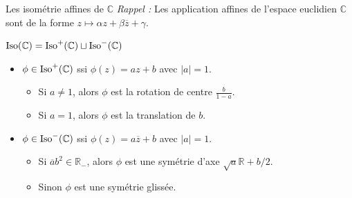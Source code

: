 \documentclass[bigger]{m53beamer}
\begin{document}
\begin{frame}{Les isométrie affines de $\mathbb{C}$}
  \textit{Rappel :} Les application affines de l'espace euclidien $\mathbb{C}$ sont de la forme $z \mapsto \alpha z+\beta\overline{z}+\gamma$.\pause\medskip

  $\operatorname{Iso}(\mathbb{C}) = \operatorname{Iso}^{+}(\mathbb{C}) \sqcup \operatorname{Iso}^{-}(\mathbb{C})$
  \begin{itemize}[<+(1)->]
    \item $\phi \in \operatorname{Iso}^{+}(\mathbb{C})$ ssi $\phi(z)=az+b$ avec $|a|=1$.
      \begin{itemize}[<+(1)->]
        \item Si $a \neq 1$, alors $\phi$ est la rotation de centre $\frac{b}{1-a}$.
        \item Si $a=1$, alors $\phi$ est la translation de $b$.
      \end{itemize}
    \item $\phi \in \operatorname{Iso}^{-}(\mathbb{C})$ ssi $\phi(z)=a\overline{z}+b$ avec $|a|=1$.
      \begin{itemize}[<+(1)->]
        \item Si $\overline{a}b^{2} \in \mathbb{R}_{-}$, alors $\phi$ est une symétrie d'axe $\sqrt{a}\mathbb{R}+b/2$.
        \item Sinon $\phi$ est une symétrie glissée.
      \end{itemize}
  \end{itemize}
\end{frame}
\end{document}
